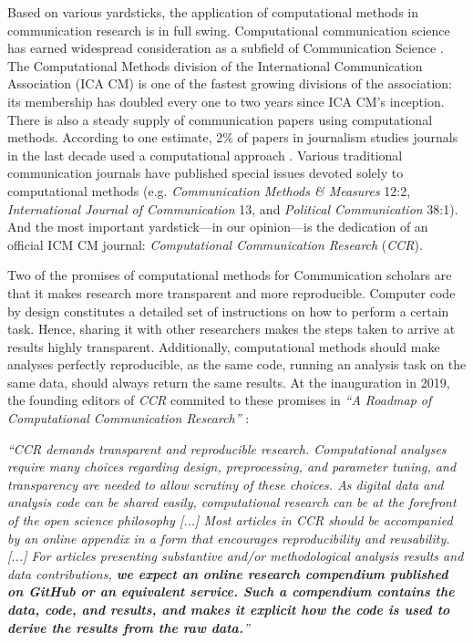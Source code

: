 

Based on various yardsticks, the application of computational methods in communication research is in full swing. Computational communication science has earned widespread consideration as a subfield of Communication Science \parencite[]{hilbert2019computational}. The Computational Methods division of the International Communication Association (ICA CM) is one of the fastest growing divisions of the association: its membership has doubled every one to two years since ICA CM's inception. There is also a steady supply of communication papers using computational methods. According to one estimate, 2\% of papers in journalism studies journals in the last decade used a computational approach \parencite{zeng:2023:EMI}. Various traditional communication journals have published special issues devoted solely to computational methods (e.g. \textit{Communication Methods \& Measures} 12:2, \textit{International Journal of Communication} 13, and \textit{Political Communication} 38:1). And the most important yardstick---in our opinion---is the dedication of an official ICM CM journal: \textit{Computational Communication Research} (\textit{CCR}).

Two of the promises of computational methods for Communication scholars are that it makes research more transparent and more reproducible.
Computer code by design constitutes a detailed set of instructions on how to perform a certain task.
Hence, sharing it with other researchers makes the steps taken to arrive at results highly transparent.
Additionally, computational methods should make analyses perfectly reproducible, as the same code, running an analysis task on the same data, should always return the same results.
At the inauguration in 2019, the founding editors of \textit{CCR} commited to these promises in \textit{``A Roadmap of Computational Communication Research''} \parencite[][\textit{Roadmap I} hereinafter, emphasis added]{ccrintro}:

\begin{displayquote}
\textit{``CCR demands transparent and reproducible research. Computational analyses require many choices regarding design, preprocessing, and parameter tuning, and transparency are needed to allow scrutiny of these choices. As digital data and analysis code can be shared easily, computational research can be at the forefront of the open science philosophy [...] Most articles in \textit{CCR} should be accompanied by an online appendix in a form that encourages reproducibility and reusability. [...] For articles presenting substantive and/or methodological analysis results and data contributions, \textbf{we expect an online research compendium published on GitHub or an equivalent service. Such a compendium contains the data, code, and results, and makes it explicit how the code is used to derive the results from the raw data.}''}
\end{displayquote}

